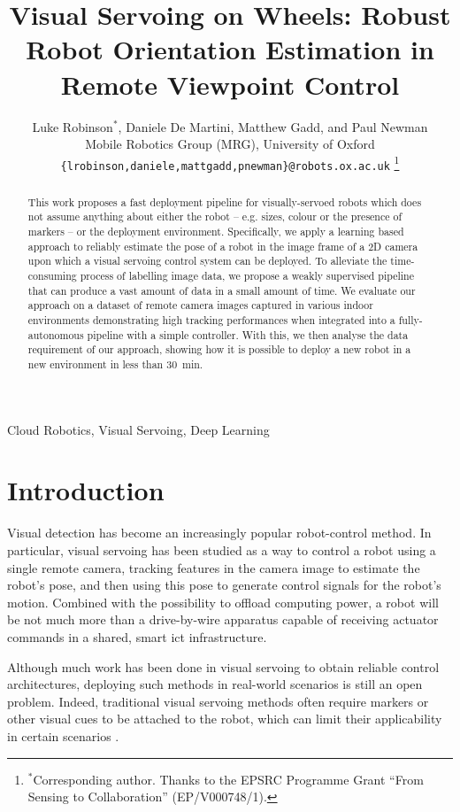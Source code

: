 \documentclass[conference]{ieeeconf}
\title{\huge \bf
Visual Servoing on Wheels: Robust Robot Orientation Estimation in Remote Viewpoint Control
}
\author{Luke Robinson$^{*}$, Daniele De Martini, Matthew Gadd, and Paul Newman
\\
Mobile Robotics Group (MRG), University of Oxford\\\texttt{\{lrobinson,daniele,mattgadd,pnewman\}@robots.ox.ac.uk}
\thanks{$^{*}$Corresponding author.
Thanks to the EPSRC Programme Grant ``From Sensing to Collaboration'' (EP/V000748/1).
}%
}
\begin{document}
\maketitle

\copyrightnotice

\begin{abstract}
This work proposes a fast deployment pipeline for visually-servoed robots which does not assume anything about either the robot -- e.g. sizes, colour or the presence of markers -- or the deployment environment.
Specifically, we apply a learning based approach to reliably estimate the pose of a robot in the image frame of a 2D camera upon which a visual servoing control system can be deployed.
To alleviate the time-consuming process of labelling image data, we propose a weakly supervised pipeline that can produce a vast amount of data in a small amount of time.
We evaluate our approach on a dataset of remote camera images captured in various indoor environments demonstrating high tracking performances when integrated into a fully-autonomous pipeline with a simple controller.
With this, we then analyse the data requirement of our approach, showing how it is possible to deploy a new robot in a new environment in less than \SI{30}{\minute}.
\end{abstract}

\begin{keywords}
Cloud Robotics, Visual Servoing, Deep Learning
\end{keywords}

\glsresetall

\section{Introduction}%
\label{sec:introduction}

Visual detection has become an increasingly popular robot-control method.
In particular, visual servoing has been studied as a way to control a robot using a single remote camera, tracking features in the camera image to estimate the robot's pose, and then using this pose to generate control signals for the robot's motion.
Combined with the possibility to offload computing power, a robot will be not much more than a drive-by-wire apparatus capable of receiving actuator commands in a shared, smart \gls{ict} infrastructure.

Although much work has been done in visual servoing to obtain reliable control architectures, deploying such methods in real-world scenarios is still an open problem.
Indeed, traditional visual servoing methods often require markers or other visual cues to be attached to the robot, which can limit their applicability in certain scenarios \cite{liang2015adaptive,liang2020purely}.
\end{document}
